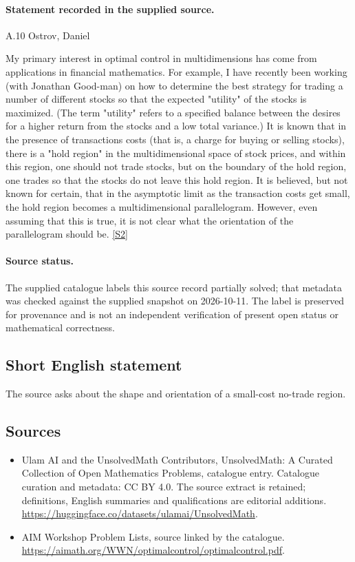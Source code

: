 \documentclass[11pt]{article}
\begin{document}
\paragraph{Statement recorded in the supplied source.}
A.10 Ostrov, Daniel

My primary interest in optimal control in multidimensions has come from applications in financial mathematics. For example, I have recently been working (with Jonathan Good-man) on how to determine the best strategy for trading a number of different stocks so that the expected "utility" of the stocks is maximized. (The term "utility" refers to a specified balance between the desires for a higher return from the stocks and a low total variance.) It is known that in the presence of transactions costs (that is, a charge for buying or selling stocks), there is a "hold region" in the multidimensional space of stock prices, and within this region, one should not trade stocks, but on the boundary of the hold region, one trades so that the stocks do not leave this hold region. It is believed, but not known for certain, that in the asymptotic limit as the transaction costs get small, the hold region becomes a multidimensional parallelogram. However, even assuming that this is true, it is not clear what the orientation of the parallelogram should be. \href{https://aimath.org/WWN/optimalcontrol/optimalcontrol.pdf}{[S2]}
\paragraph{Source status.}
The supplied catalogue labels this source record partially solved; that metadata was checked against the supplied snapshot on 2026-10-11. The label is preserved for provenance and is not an independent verification of present open status or mathematical correctness.
\subsection{Short English statement}
The source asks about the shape and orientation of a small-cost no-trade region.
\subsection{Sources}
\begin{itemize}
\item[S1] Ulam AI and the UnsolvedMath Contributors, UnsolvedMath: A Curated Collection of Open Mathematics Problems, catalogue entry. Catalogue curation and metadata: CC BY 4.0. The source extract is retained; definitions, English summaries and qualifications are editorial additions.
\url{https://huggingface.co/datasets/ulamai/UnsolvedMath}.
\item[S2] AIM Workshop Problem Lists, source linked by the catalogue.
\url{https://aimath.org/WWN/optimalcontrol/optimalcontrol.pdf}.
\end{itemize}
\end{document}
